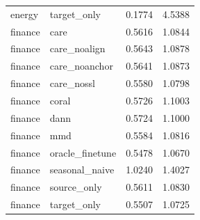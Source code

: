 {\begin{longtable}{@{}p{}p{}p{}p{}@{}}
energy & target\_\allowbreak{}only & 0.1774 & 4.5388 \\
finance & care & 0.5616 & 1.0844 \\
finance & care\_\allowbreak{}noalign & 0.5643 & 1.0878 \\
finance & care\_\allowbreak{}noanchor & 0.5641 & 1.0873 \\
finance & care\_\allowbreak{}nossl & 0.5580 & 1.0798 \\
finance & coral & 0.5726 & 1.1003 \\
finance & dann & 0.5724 & 1.1000 \\
finance & mmd & 0.5584 & 1.0816 \\
finance & oracle\_\allowbreak{}finetune & 0.5478 & 1.0670 \\
finance & seasonal\_\allowbreak{}naive & 1.0240 & 1.4027 \\
finance & source\_\allowbreak{}only & 0.5611 & 1.0830 \\
finance & target\_\allowbreak{}only & 0.5507 & 1.0725 \\
\end{longtable}
}
